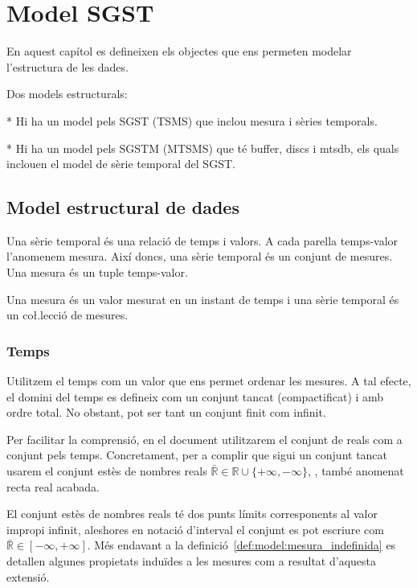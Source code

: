 
\chapter{Model SGST}

En aquest capítol es defineixen els objectes que ens permeten modelar l'estructura de les dades.

Dos models estructurals:

* Hi ha un model pels SGST (TSMS) que inclou mesura i sèries temporals.

* Hi ha un model pels SGSTM (MTSMS) que té buffer, discs i mtsdb, els quals inclouen el model de sèrie temporal del SGST.




\section{Model estructural de dades}

Una sèrie temporal és una relació de temps i valors. A cada parella
temps-valor l'anomenem mesura. Així doncs, una sèrie temporal és un
conjunt de mesures. Una mesura és un tuple temps-valor.



Una mesura és un valor mesurat en un instant de temps i una sèrie
temporal és un co\l.lecció de mesures.





\subsection{Temps}

Utilitzem el temps com un valor que ens permet ordenar les mesures.  A
tal efecte, el domini del temps es defineix com un conjunt tancat
(compactificat) i amb ordre total. No obstant, pot ser tant un conjunt
finit com infinit.

Per facilitar la comprensió, en el document utilitzarem el conjunt de
reals com a conjunt pels temps. Concretament, per a complir que sigui
un conjunt tancat usarem el conjunt estès de nombres reals
$\bar{\mathbb{R}} \in \mathbb{R} \cup
\{+\infty,-\infty\}$, \parencite{wiki:extendedreal,cantrell:extendedreal},
també anomenat recta real acabada.


El conjunt estès de nombres reals té dos punts límits corresponents al
valor impropi infinit, aleshores en notació d'interval el conjunt es
pot escriure com $\bar{\mathbb{R}} \in [-\infty,+\infty]$.  Més
endavant a la definició~\ref{def:model:mesura_indefinida} es detallen
algunes propietats induïdes a les mesures com a resultat d'aquesta
extensió.

